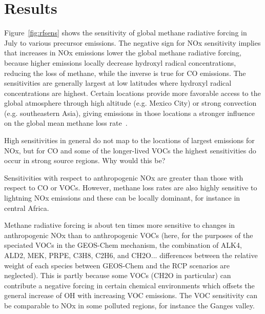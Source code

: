\section{Results}

Figure~\ref{fig:rfsens} shows the sensitivity of global methane radiative forcing in July to various precursor emissions. The negative sign for NOx sensitivity implies that increases in NOx emissions lower the global methane radiative forcing, because higher emissions locally decrease hydroxyl radical concentrations, reducing the loss of methane, while the inverse is true for CO emissions. The sensitivities are generally largest at low latitudes where hydroxyl radical concentrations are highest. Certain locations provide more favorable access to the global atmosphere through high altitude (e.g. Mexico City) or strong convection (e.g. southeastern Asia), giving emissions in those locations a stronger influence on the global mean methane loss rate~\citep{ref:bowman2012}.

High sensitivities in general do not map to the locations of largest emissions for NOx, but for CO and some of the longer-lived VOCs the highest sensitivities do occur in strong source regions. Why would this be?

Sensitivities with respect to anthropogenic NOx are greater than those with respect to CO or VOCs. However, methane loss rates are also highly sensitive to lightning NOx emissions and these can be locally dominant, for instance in central Africa.

Methane radiative forcing is about ten times more sensitive to changes in anthropogenic NOx than to anthropogenic VOCs (here, for the purposes of the speciated VOCs in the GEOS-Chem mechanism, the combination of ALK4, ALD2, MEK, PRPE, C3H8, C2H6, and CH2O... differences between the relative weight of each species between GEOS-Chem and the RCP scenarios are neglected). This is partly because some VOCs (CH2O in particular) can contribute a negative forcing in certain chemical environments which offsets the general increase of OH with increasing VOC emissions. The VOC sensitivity can be comparable to NOx in some polluted regions, for instance the Ganges valley.

